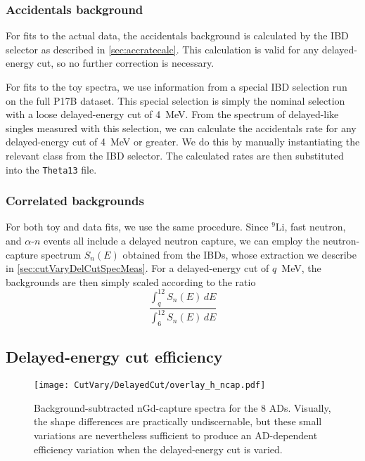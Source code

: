 \documentclass[../thesis.tex]{subfiles}
\begin{document}
\subsubsection{Accidentals background}

For fits to the actual data, the accidentals background is calculated by the IBD selector as described in \autoref{sec:accratecalc}. This calculation is valid for any delayed-energy cut, so no further correction is necessary.

For fits to the toy spectra, we use information from a special IBD selection run on the full P17B dataset. This special selection is simply the nominal selection with a loose delayed-energy cut of 4~MeV. From the spectrum of delayed-like singles measured with this selection, we can calculate the accidentals rate for any delayed-energy cut of 4~MeV or greater. We do this by manually instantiating the relevant class from the IBD selector. The calculated rates are then substituted into the \texttt{Theta13} file.

\subsubsection{Correlated backgrounds}

For both toy and data fits, we use the same procedure. Since $^9$Li, fast neutron, and $\alpha$-$n$ events all include a delayed neutron capture, we can employ the neutron-capture spectrum $S_n(E)$ obtained from the IBDs, whose extraction we describe in \autoref{sec:cutVaryDelCutSpecMeas}. For a delayed-energy cut of $q$~MeV, the backgrounds are then simply scaled according to the ratio
\begin{equation}
  \label{eq:cutVaryDelCutCorrBkgScale}
  \frac{\int_q^{12} S_n(E)\,dE}{\int_6^{12} S_n(E)\,dE}
\end{equation}

\subsection{Delayed-energy cut efficiency}
\label{sec:cutVaryDelCutEff}

\begin{figure}[ht]
  \texttt{[image: CutVary/DelayedCut/overlay\_h\_ncap.pdf]}
  \caption{Background-subtracted nGd-capture spectra for the 8 ADs. Visually, the shape differences are practically undiscernable, but these small variations are nevertheless sufficient to produce an AD-dependent efficiency variation when the delayed-energy cut is varied.}
  \label{fig:cutVaryDelCutSpecOverlay}
\end{figure}
\end{document}
